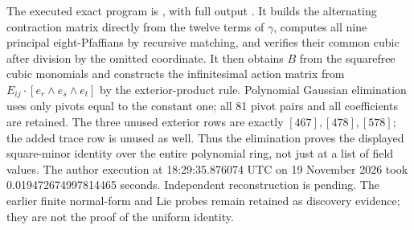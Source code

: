 \begin{remark}
\label{rem:p-rank-zero-polar-unit-certificate-candidate}
The executed exact program is
,
with full output
.
It builds the alternating contraction matrix directly from the twelve
terms of $\gamma$, computes all nine principal eight-Pfaffians by
recursive matching, and verifies their common cubic after division
by the omitted coordinate. It then obtains $B$ from the squarefree
cubic monomials and constructs the infinitesimal action matrix from
$E_{ij}\cdot[e_r\wedge e_s\wedge e_t]$ by the exterior-product rule.
Polynomial Gaussian elimination uses only pivots equal to the constant
one; all 81 pivot pairs and all coefficients are retained.
The three unused exterior rows are exactly $[467],[478],[578]$;
the added trace row is unused as well. Thus the elimination proves
the displayed square-minor identity over the entire polynomial ring,
not just at a list of field values. The author execution at
18:29:35.876074 UTC on 19 November 2026 took
0.019472674997814465 seconds. Independent reconstruction is pending.
The earlier finite normal-form and Lie probes remain retained as
discovery evidence; they are not the proof of the uniform identity.
\end{remark}

